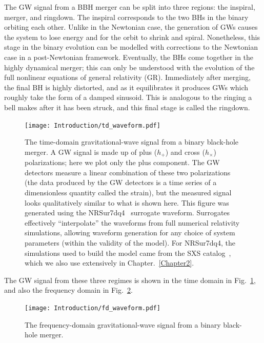 The GW signal from a BBH merger can be split into three regions: the inspiral, merger, and ringdown.
The inspiral corresponds to the two BHs in the binary orbiting each other. 
Unlike in the Newtonian case, the generation of GWs causes the system to lose energy and for the orbit to shrink and spiral. 
Nonetheless, this stage in the binary evolution can be modelled with corrections to the Newtonian case in a post-Newtonian framework. 
Eventually, the BHs come together in the highly dynamical merger; this can only be understood with the evolution of the full nonlinear equations of general relativity (GR). 
Immediately after merging, the final BH is highly distorted, and as it equilibrates it produces GWs which roughly take the form of a damped sinusoid. 
This is analogous to the ringing a bell makes after it has been struck, and this final stage is called the ringdown.

\begin{figure}[t]
	\centering
	\texttt{[image: Introduction/td\_waveform.pdf]}
	\caption[The time-domain gravitational-wave signal from a binary black-hole merger.]{ 
		The time-domain gravitational-wave signal from a binary black-hole merger. A GW signal is made up of plus ($h_+$) and cross ($h_{\times}$) polarizations; here we plot only the plus component. The GW detectors measure a linear combination of these two polarizations (the data produced by the GW detectors is a time series of a dimensionless quantity called the strain), but the measured signal looks qualitatively similar to what is shown here. This figure was generated using the NRSur7dq4~\cite{Varma:2019csw} surrogate waveform. Surrogates effectively ``interpolate'' the waveforms from full numerical relativity simulations, allowing waveform generation for any choice of system parameters (within the validity of the model). For NRSur7dq4, the simulations used to build the model came from the SXS catalog~\cite{sxs_catalog}, which we also use extensively in Chapter.~\ref{Chapter2}.}
	\label{fig:ch1:td_waveform}
\end{figure}

The GW signal from these three regimes is shown in the time domain in Fig.~\ref{fig:ch1:td_waveform}, and also the frequency domain in Fig.~\ref{fig:ch1:fd_waveform}. 

\begin{figure}[t]
	\centering
	\texttt{[image: Introduction/fd\_waveform.pdf]}
	\caption[The frequency-domain gravitational-wave signal from a binary black-hole merger.]{ 
		The frequency-domain gravitational-wave signal from a binary black-hole merger.}
	\label{fig:ch1:fd_waveform}
\end{figure}

